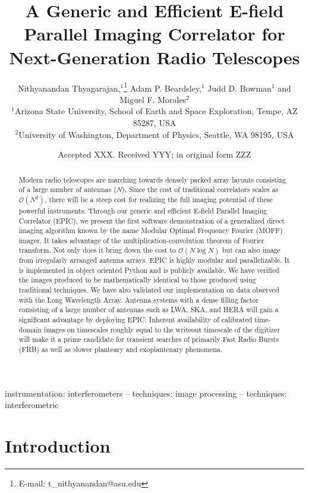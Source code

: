 \documentclass[a4paper,fleqn,usenatbib]{../mnras}
\title[E-field Parallel Imaging Correlator]{A Generic and Efficient E-field Parallel Imaging Correlator for Next-Generation Radio Telescopes}
\author[Thyagarajan et al.]{
Nithyanandan Thyagarajan,$^{1}$\thanks{E-mail: t\_nithyanandan@asu.edu}
Adam P. Beardsley,$^{1}$
Judd D. Bowman$^{1}$
\newauthor
and Miguel F. Morales$^{2}$
\\
$^{1}$Arizona State University, School of Earth and Space Exploration, Tempe, AZ 85287, USA\\
$^{2}$University of Washington, Department of Physics, Seattle, WA 98195, USA\\
}
\date{Accepted XXX. Received YYY; in original form ZZZ}
\begin{document}
\label{firstpage}
\pagerange{\pageref{firstpage}--\pageref{lastpage}}
\maketitle

\begin{abstract}
Modern radio telescopes are marching towards densely packed array layouts 
consisting of a large number of antennas ($N$). Since the cost of traditional 
correlators scales as $\mathcal{O}(N^2)$, there will be a steep cost for 
realizing the full imaging potential of these powerful instruments. Through 
our generic and efficient E-field Parallel Imaging Correlator (EPIC), we present 
the first software demonstration of a generalized direct imaging algorithm 
known by the name Modular Optimal Frequency Fourier (MOFF) imager. It takes 
advantage of the multiplication-convolution theorem of Fourier transform. Not 
only does it bring down the cost to $\mathcal{O}(N\log N)$ but can also image 
from irregularly arranged antenna arrays. EPIC is highly modular and 
parallelizable. It is implemented in object oriented Python and is publicly 
available. We have verified the images produced to be mathematically identical 
to those produced using traditional techniques. We have also validated our 
implementation on data observed with the Long Wavelength Array. Antenna systems
with a dense filling factor consisting of a large number of antennas such as 
LWA, SKA, and HERA will gain a significant advantage by deploying EPIC. 
Inherent availability of calibrated time-domain images on timescales roughly 
equal to the writeout timescale of the digitizer will make it a prime 
candidate for transient searches of primarily Fast Radio Bursts (FRB) as well 
as slower planteary and exoplantenary phenomena. 
\end{abstract}

\begin{keywords}
instrumentation: interferometers -- techniques: image processing -- techniques: interferometric
\end{keywords}



\section{Introduction}
\end{document}
